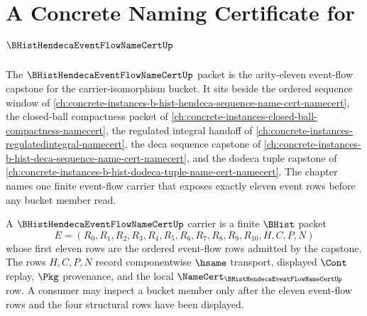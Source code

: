 \chapter{A Concrete Naming Certificate for $\BHistHendecaEventFlowNameCertUp$}
\label{ch:concrete-instances-b-hist-hendeca-event-flow-name-cert-namecert}

The $\BHistHendecaEventFlowNameCertUp$ packet is the arity-eleven event-flow capstone for the carrier-isomorphism bucket. It sits beside the ordered sequence window of \autoref{ch:concrete-instances-b-hist-hendeca-sequence-name-cert-namecert}, the closed-ball compactness packet of \autoref{ch:concrete-instances-closed-ball-compactness-namecert}, the regulated integral handoff of \autoref{ch:concrete-instances-regulatedintegral-namecert}, the deca sequence capstone of \autoref{ch:concrete-instances-b-hist-deca-sequence-name-cert-namecert}, and the dodeca tuple capstone of \autoref{ch:concrete-instances-b-hist-dodeca-tuple-name-cert-namecert}. The chapter names one finite event-flow carrier that exposes exactly eleven event rows before any bucket member read.




\begin{definition}
\label{def:b-hist-hendeca-event-flow-name-cert-carrier}
A $\BHistHendecaEventFlowNameCertUp$ carrier is a finite $\BHist$ packet
$$
E=(R_0,R_1,R_2,R_3,R_4,R_5,R_6,R_7,R_8,R_9,R_{10},H,C,P,N)
$$
whose first eleven rows are the ordered event-flow rows admitted by the capstone. The rows $H,C,P,N$ record componentwise $\hsame$ transport, displayed $\Cont$ replay, $\Pkg$ provenance, and the local $\NameCert_{\BHistHendecaEventFlowNameCertUp}$ row. A consumer may inspect a bucket member only after the eleven event-flow rows and the four structural rows have been displayed.
\end{definition}

